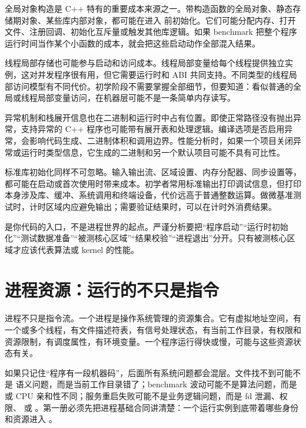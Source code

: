 全局对象构造是 C++ 特有的重要成本来源之一。带构造函数的全局对象、静态存储期对象、某些库内部对象，都可能在进入  前初始化。它们可能分配内存、打开文件、注册回调、初始化互斥量或触发其他库逻辑。如果 benchmark 把整个程序运行时间当作某个小函数的成本，就会把这些启动动作全部混入结果。

线程局部存储也可能参与启动和访问成本。线程局部变量给每个线程提供独立实例，这对并发程序很有用，但它需要运行时和 ABI 共同支持。不同类型的线程局部访问模型有不同代价。初学阶段不需要掌握全部细节，但要知道：看似普通的全局或线程局部变量访问，在机器层可能不是一条简单内存读写。

异常机制和栈展开信息也在二进制和运行时中占有位置。即使正常路径没有抛出异常，支持异常的 C++ 程序也可能带有展开表和处理逻辑。编译选项是否启用异常，会影响代码生成、二进制体积和调用边界。性能分析时，如果一个项目关闭异常或运行时类型信息，它生成的二进制和另一个默认项目可能不具有可比性。

标准库初始化同样不可忽略。输入输出流、区域设置、内存分配器、同步设置等，都可能在启动或首次使用时带来成本。初学者常用标准输出打印调试信息，但打印本身涉及库、缓冲、系统调用和终端设备，代价远高于普通整数运算。做微基准测试时，计时区域内应避免输出；需要验证结果时，可以在计时外消费结果。

\begin{mentalmodel}
 是你代码的入口，不是进程世界的起点。严谨分析要把“程序启动”“运行时初始化”“测试数据准备”“被测核心区域”“结果校验”“进程退出”分开。只有被测核心区域才应该代表算法或 kernel 的性能。
\end{mentalmodel}

\section{进程资源：运行的不只是指令}

进程不只是指令流。一个进程是操作系统管理的资源集合。它有虚拟地址空间，有一个或多个线程，有文件描述符表，有信号处理状态，有当前工作目录，有权限和资源限制，有调度属性，有环境变量。一个程序运行得快或慢，可能与这些资源状态有关。

如果只记住“程序有一段机器码”，后面所有系统问题都会混层。文件找不到可能不是  语义问题，而是当前工作目录错了；benchmark 波动可能不是算法问题，而是  或 CPU 亲和性不同；服务重启失败可能不是业务逻辑问题，而是 fd 泄漏、权限、 或 。第一册必须先把进程基础合同讲清楚：一个运行实例到底带着哪些身份和资源进入 。

